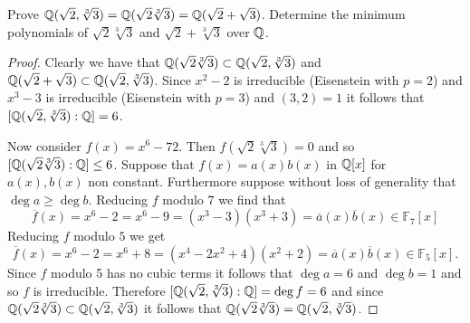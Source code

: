     \begin{ex}{21.28}
        Prove $\mathbb{Q}(\sqrt{2},\sqrt[3]{3})=\mathbb{Q}(\sqrt{2}\sqrt[3]{3})=\mathbb{Q}(\sqrt{2}+\sqrt{3})$.
        Determine the minimum polynomials of $\sqrt{2}\sqrt[3]{3}$ and $\sqrt{2}+\sqrt[3]{3}$ over $\mathbb{Q}$.
    \end{ex}
    \begin{proof}
        Clearly we have that $\mathbb{Q}(\sqrt{2}\sqrt[3]{3})\subset\mathbb{Q}(\sqrt{2},\sqrt[3]{3})$ 
        and $\mathbb{Q}(\sqrt{2}+\sqrt{3})\subset\mathbb{Q}(\sqrt{2},\sqrt[3]{3})$. 
        Since $x^2-2$ is irreducible (Eisenstein with $p=2$) and $x^3-3$ is irreducible (Eisenstein with $p=3$) and $(3,2)=1$ it follows that $[\mathbb{Q}(\sqrt{2},\sqrt[3]{3}):\mathbb{Q}]=6$.

        Now consider $f(x)=x^6-72$. Then $f(\sqrt{2}\sqrt[3]{3})=0$ and so $[\mathbb{Q}(\sqrt{2}\sqrt[3]{3}):\mathbb{Q}]\leq 6$.
        Suppose that $f(x)=a(x)b(x)$ in $\mathbb{Q}[x]$ for $a(x),b(x)$ non constant. Furthermore suppose without loss of generality that $\deg a\geq \deg b$.
        Reducing $f$ modulo $7$ we find that 
        $$\overline{f}(x)=x^6-2=x^6-9=(x^3-3)(x^3+3)=\overline{a}(x)\overline{b}(x)\in\mathbb{F}_7[x]$$
        Reducing $f$ modulo $5$ we get
        $$\overline{f}(x)=x^6-2=x^6+8=(x^4-2x^2+4)(x^2+2)=\overline{a}(x)\overline{b}(x)\in\mathbb{F}_5[x].$$
        Since $f$ modulo 5 has no cubic terms it follows that $\deg a = 6$ and $\deg b = 1$ and so $f$ is irreducible. Therefore $[\mathbb{Q}(\sqrt{2},\sqrt[3]{3}):\mathbb{Q}]=\deg f=6$
        and since $\mathbb{Q}(\sqrt{2}\sqrt[3]{3})\subset\mathbb{Q}(\sqrt{2},\sqrt[3]{3})$ it follows that $\mathbb{Q}(\sqrt{2}\sqrt[3]{3})=\mathbb{Q}(\sqrt{2},\sqrt[3]{3})$. 

        
    \end{proof}


